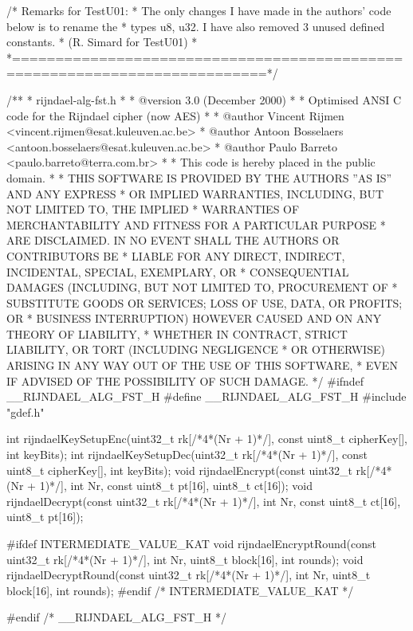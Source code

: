 \code
/*                       Remarks for TestU01:
 * The only changes I have made in the authors' code below is to rename the
 * types u8, u32. I have also removed 3 unused defined constants.
 * (R. Simard for TestU01)
 *
 *===========================================================================*/
 
/**
 * rijndael-alg-fst.h
 *
 * @version 3.0 (December 2000)
 *
 * Optimised ANSI C code for the Rijndael cipher (now AES)
 *
 * @author Vincent Rijmen <vincent.rijmen@esat.kuleuven.ac.be>
 * @author Antoon Bosselaers <antoon.bosselaers@esat.kuleuven.ac.be>
 * @author Paulo Barreto <paulo.barreto@terra.com.br>
 *
 * This code is hereby placed in the public domain.
 *
 * THIS SOFTWARE IS PROVIDED BY THE AUTHORS ''AS IS'' AND ANY EXPRESS
 * OR IMPLIED WARRANTIES, INCLUDING, BUT NOT LIMITED TO, THE IMPLIED
 * WARRANTIES OF MERCHANTABILITY AND FITNESS FOR A PARTICULAR PURPOSE
 * ARE DISCLAIMED.  IN NO EVENT SHALL THE AUTHORS OR CONTRIBUTORS BE
 * LIABLE FOR ANY DIRECT, INDIRECT, INCIDENTAL, SPECIAL, EXEMPLARY, OR
 * CONSEQUENTIAL DAMAGES (INCLUDING, BUT NOT LIMITED TO, PROCUREMENT OF
 * SUBSTITUTE GOODS OR SERVICES; LOSS OF USE, DATA, OR PROFITS; OR
 * BUSINESS INTERRUPTION) HOWEVER CAUSED AND ON ANY THEORY OF LIABILITY,
 * WHETHER IN CONTRACT, STRICT LIABILITY, OR TORT (INCLUDING NEGLIGENCE
 * OR OTHERWISE) ARISING IN ANY WAY OUT OF THE USE OF THIS SOFTWARE,
 * EVEN IF ADVISED OF THE POSSIBILITY OF SUCH DAMAGE.
 */
#ifndef __RIJNDAEL_ALG_FST_H
#define __RIJNDAEL_ALG_FST_H
#include "gdef.h"


int rijndaelKeySetupEnc(uint32_t rk[/*4*(Nr + 1)*/], const uint8_t cipherKey[], int keyBits);
int rijndaelKeySetupDec(uint32_t rk[/*4*(Nr + 1)*/], const uint8_t cipherKey[], int keyBits);
void rijndaelEncrypt(const uint32_t rk[/*4*(Nr + 1)*/], int Nr, const uint8_t pt[16], uint8_t ct[16]);
void rijndaelDecrypt(const uint32_t rk[/*4*(Nr + 1)*/], int Nr, const uint8_t ct[16], uint8_t pt[16]);

#ifdef INTERMEDIATE_VALUE_KAT
void rijndaelEncryptRound(const uint32_t rk[/*4*(Nr + 1)*/], int Nr, uint8_t block[16], int rounds);
void rijndaelDecryptRound(const uint32_t rk[/*4*(Nr + 1)*/], int Nr, uint8_t block[16], int rounds);
#endif /* INTERMEDIATE_VALUE_KAT */

#endif /* __RIJNDAEL_ALG_FST_H */
\endcode
